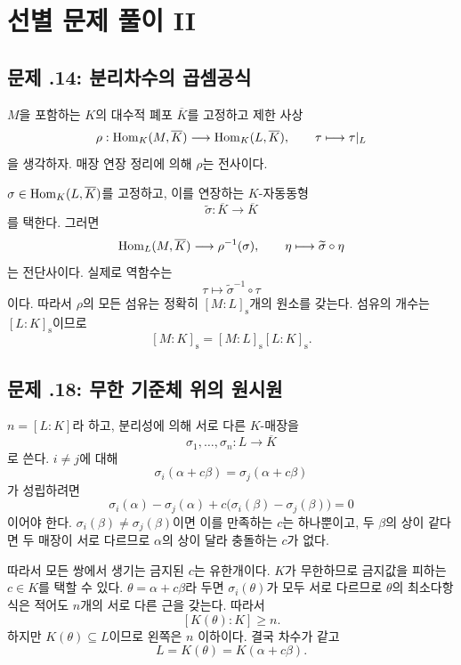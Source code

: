 \section{선별 문제 풀이 II}
\label{sec:separability-solutions-b}

\subsection*{문제 \thechapter.14: 분리차수의 곱셈공식}

\begin{solution}
$M$을 포함하는 $K$의 대수적 폐포 $\overline K$를 고정하고 제한 사상
\[
  \rho:\operatorname{Hom}_K(M,\overline K)
  \longrightarrow\operatorname{Hom}_K(L,\overline K),
  \qquad \tau\longmapsto\tau|_L
\]
을 생각하자. 매장 연장 정리에 의해 $\rho$는 전사이다.

$\sigma\in\operatorname{Hom}_K(L,\overline K)$를 고정하고, 이를 연장하는 $K$-자동동형
\[
  \widetilde\sigma:\overline K\longrightarrow\overline K
\]
를 택한다. 그러면
\[
  \operatorname{Hom}_L(M,\overline K)\longrightarrow\rho^{-1}(\sigma),
  \qquad
  \eta\longmapsto\widetilde\sigma\circ\eta
\]
는 전단사이다. 실제로 역함수는
\[
  \tau\longmapsto\widetilde\sigma^{-1}\circ\tau
\]
이다. 따라서 $\rho$의 모든 섬유는 정확히 $[M:L]_{\mathrm s}$개의 원소를 갖는다. 섬유의 개수는 $[L:K]_{\mathrm s}$이므로
\[
  [M:K]_{\mathrm s}
  =[M:L]_{\mathrm s}[L:K]_{\mathrm s}.
\]
\end{solution}

\subsection*{문제 \thechapter.18: 무한 기준체 위의 원시원}

\begin{solution}
$n=[L:K]$라 하고, 분리성에 의해 서로 다른 $K$-매장을
\[
  \sigma_1,\dots,\sigma_n:L\to\overline K
\]
로 쓴다. $i\ne j$에 대해
\[
  \sigma_i(\alpha+c\beta)=\sigma_j(\alpha+c\beta)
\]
가 성립하려면
\[
  \sigma_i(\alpha)-\sigma_j(\alpha)
  +c\bigl(\sigma_i(\beta)-\sigma_j(\beta)\bigr)=0
\]
이어야 한다. $\sigma_i(\beta)\ne\sigma_j(\beta)$이면 이를 만족하는 $c$는 하나뿐이고, 두 $\beta$의 상이 같다면 두 매장이 서로 다르므로 $\alpha$의 상이 달라 충돌하는 $c$가 없다.

따라서 모든 쌍에서 생기는 금지된 $c$는 유한개이다. $K$가 무한하므로 금지값을 피하는 $c\in K$를 택할 수 있다. $\theta=\alpha+c\beta$라 두면 $\sigma_i(\theta)$가 모두 서로 다르므로 $\theta$의 최소다항식은 적어도 $n$개의 서로 다른 근을 갖는다. 따라서
\[
  [K(\theta):K]\ge n.
\]
하지만 $K(\theta)\subseteq L$이므로 왼쪽은 $n$ 이하이다. 결국 차수가 같고
\[
  L=K(\theta)=K(\alpha+c\beta).
\]
\end{solution}

